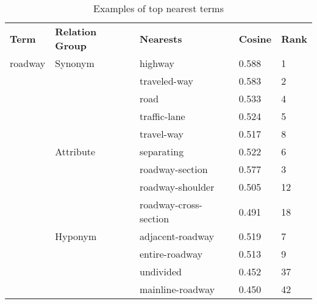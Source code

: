 \documentclass[Journal, InsideFigs, DoubleSpace]{ascelike} %
\begin{document}

%
\begin{table} [t]
	\caption{Examples of top nearest terms}
	\label{table:term_clustering}
	\centering
	\small
	\renewcommand{\arraystretch}{1.25}
	\begin{tabular}{l l l l l}
		\hline
		\textbf{Term}	&\textbf{Relation Group}	& \textbf{Nearests} & \textbf{Cosine} & \textbf{Rank}\\
		roadway			&Synonym					& highway & 0.588 & 1\\
						&							& traveled-way & 0.583 & 2\\
						&							& road & 0.533 & 4\\						
						&							& traffic-lane & 0.524 &5\\ 						
						&							& travel-way & 0.517 & 8\\  \cmidrule{2-5}
						&Attribute					& separating & 0.522 &6\\
						&							& roadway-section & 0.577 & 3\\						
						&							& roadway-shoulder & 0.505 & 12\\
						&							& roadway-cross-section & 0.491 & 18\\\cmidrule{2-5}						
						&Hyponym					& adjacent-roadway & 0.519 & 7\\
						&							& entire-roadway & 0.513 & 9\\
						&							& undivided & 0.452 & 37\\
						&							& mainline-roadway & 0.450 & 42\\
		\hline
	\end{tabular}
	\normalsize
\end{table}
\end{document}
